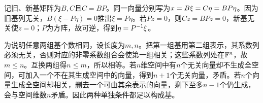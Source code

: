 \label{der:3-3}
记旧、新基矩阵为$B,C$且$C=BP$。同一向量分别写为$x=B\xi=C\eta=BP\eta$。因为旧基列无关，$B(\xi-P\eta)=0$推出$\xi=P\eta$。若$Pz=0$，则$Cz=BPz=0$，新基无关使$z=0$；$P$为方阵，故可逆，得到$\eta=P^{-1}\xi$。

为说明任意两组基个数相同，设长度为$m,n$。把第一组基用第二组表示，其系数列必须无关，否则对应的非零系数组合会使第一组相关；这些系数列处在$\mathbb{F}^n$，故$m\le n$。互换两组得$n\le m$，所以相等。若$n$维空间中有$n$个无关向量却不生成全空间，可加入一个不在其生成空间中的向量，得到$n+1$个无关向量，矛盾。若$n$个向量生成全空间却相关，删去一个可由其余表示的向量，剩下至多$n-1$个仍生成，会与空间维数$n$矛盾。因此两种单独条件都足以构成基。
